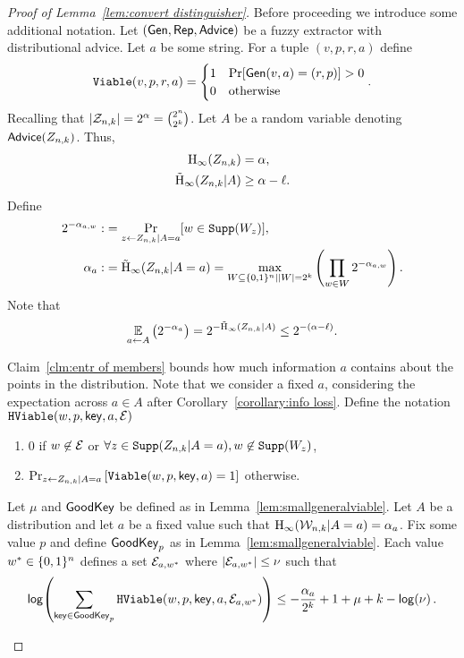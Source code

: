 \begin{proof}[Proof of Lemma~\ref{lem:convert distinguisher}]
Before proceeding we introduce some additional notation.
 Let $({\mathsf{Gen}}, {\mathsf{Rep}}, {\mathsf{Advice}})$ be a fuzzy extractor with distributional advice. Let $a$ be some string.  For a tuple $(v, p, r, a)$ define 
\[
\mathtt{Viable}(v, p, r,a) = \begin{cases} 1& \Pr[{\mathsf{Gen}}(v, a) = (r, p)]>0\\0&\text{otherwise}\end{cases}.\]
 Recalling that $|\mathcal{Z}_{n,k}| = 2^\alpha = {2^n\choose 2^k}$.  Let $A$ be a random variable denoting ${\mathsf{Advice}}(Z_{n,k})$.  Thus,  
\begin{align*}
\mathrm{H}_\infty(Z_{n,k})&=\alpha,\\
\tilde{\mathrm{H}}_\infty(Z_{n,k}|A)&\ge \alpha - \ell.
\end{align*}
Define 
\begin{align*}
2^{-\alpha_{a,w}}:&=\Pr_{z\leftarrow Z_{n,k} | A=a}[w\in \mathtt{Supp}(W_z)],\\
\alpha_a:&=\tilde{\mathrm{H}}_\infty(Z_{n,k}|A=a)=\max_{W\subseteq \{0, 1\}^n | |W|=2^k}\left(\prod_{w\in W} 2^{-\alpha_{a,w}} \right).
\end{align*}  
 Note that \[\operatorname*{\mathbb{E}}_{a\leftarrow A} \left(2^{-\alpha_a} \right) =2^{-\tilde{\mathrm{H}}_\infty(Z_{n,k}|A)}\le 2^{-(\alpha-\ell)}.\] 

Claim~\ref{clm:entr of members} bounds how much information $a$ contains about the points in the distribution.  Note that we consider a fixed $a$, considering the expectation across $a\in A$ after Corollary~\ref{corollary:info loss}.   Define the notation
$\mathtt{HViable}(w, p, \mathsf{key}, a, \mathcal{E})$
\begin{enumerate}
\item 
$0$ if $ w\not\in \mathcal{E}$ or $\forall z\in\mathtt{Supp}(Z_{n,k}|A=a), w\not\in\mathtt{Supp}(W_z)$,
\item $
\Pr_{z\leftarrow Z_{n,k} |A =a}\left[\mathtt{Viable}(w, p, \mathsf{key}, a) = 1\right]$ otherwise.
\end{enumerate}

\begin{claim}
Let $\mu$ and $\mathsf{GoodKey}$ be defined as in Lemma~\ref{lem:smallgeneralviable}.
Let $A$ be a distribution and let $a$ be a fixed value such that $\mathrm{H}_\infty(\mathcal{W}_{n,k}|A=a) =\alpha_a$.  Fix some value $p$ and define $\mathsf{GoodKey}_p$ as in Lemma~\ref{lem:smallgeneralviable}.  Each value $w^*\in\{0, 1\}^n$ defines a set $\mathcal{E}_{a, w^*}$ where $|\mathcal{E}_{a,w^*}| \le \nu$ such that
\begin{align*}
\mathsf{log}\!\left(\sum_{\mathsf{key}\in\mathsf{GoodKey}_p}\mathtt{HViable}(w, p, \mathsf{key}, a, \mathcal{E}_{a,w^*})\right)\le -\frac{\alpha_a}{2^k}+1+\mu+k-\mathsf{log}\!\left(\nu\right).
\end{align*}


\end{claim}
\end{proof}
